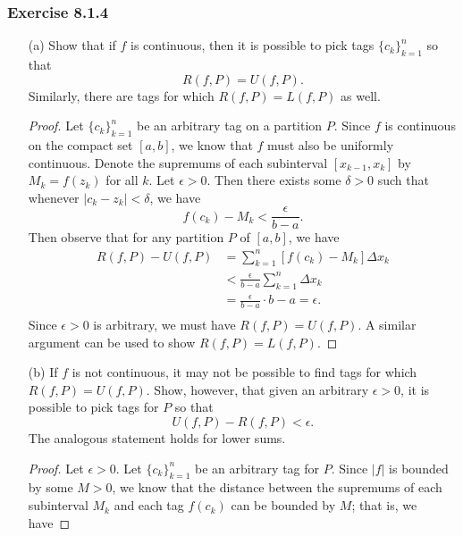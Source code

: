 \subsubsection{Exercise 8.1.4} 
\begin{enumerate}
    \item[(a)] Show that if \( f  \) is continuous, then it is possible to pick tags \( \{ c_{k } \}_{k=1}^n  \) so that 
        \[  R(f,P) = U(f,P). \] Similarly, there are tags for which \( R(f,P) = L(f,P)  \) as well.
        \begin{proof}
            Let \( \{ c_{k }  \}_{k=1}^n  \) be an arbitrary tag on a partition \( P \). Since \( f \) is continuous on the compact set \( [a,b] \), we know that \( f  \) must also be uniformly continuous. Denote the supremums of each subinterval \(  [x_{k-1}, x_{k }] \) by \( M_{k } = f(z_{k })  \) for all \( k  \).  Let \( \epsilon >0  \). Then there exists some \( \delta > 0  \) such that whenever \( | c_{k } - z_{k } | < \delta  \), we have 
            \[   f(c_{k}) - M_{k }     < \frac{ \epsilon  }{ b -a  }. \] Then observe that for any partition \( P  \) of \( [a,b]  \), we have
        \begin{align*}
            R(f,P) - U(f, P) &= \sum_{ k=1 }^{ n } [f(c_{k }) - M_{k } ] \Delta x_{k } \\
                             &< \frac{ \epsilon  }{ b -a  } \sum_{ k=1 }^{ n } \Delta x_{k } \\
                             &= \frac{ \epsilon  }{ b -a  } \cdot b-a = \epsilon. \\
        \end{align*}
        Since \( \epsilon > 0 \) is arbitrary, we must have \( R(f,P) = U(f,P) \). A similar argument can be used to show \( R(f,P) = L(f,P) \).
        \end{proof}
    \item[(b)] If \( f  \) is not continuous, it may not be possible to find tags for which \( R(f,P) = U(f,P) \). Show, however, that given an arbitrary \( \epsilon >0  \), it is possible to pick tags for \( P  \) so that 
        \[  U(f,P) - R(f,P) < \epsilon. \] The analogous statement holds for lower sums.
        \begin{proof}
            Let \( \epsilon > 0  \). Let \( \{ c_{k } \}_{k=1}^{n}  \) be an arbitrary tag for \( P  \). Since \( | f |  \) is bounded by some \( M > 0  \), we know that the distance between the supremums of each subinterval \( M_{k} \) and each tag \( f(c_{k }) \) can be bounded by \( M  \); that is, we have 

\end{proof}
\end{enumerate}
